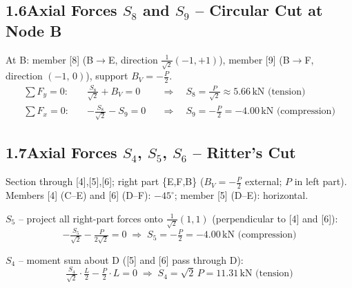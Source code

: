 \documentclass[a4paper,11pt]{article}
\begin{document}
\begin{center}
\end{center}


\subsection*{1.6\quad Axial Forces $S_8$ and $S_9$ -- Circular Cut at Node B}

At B: member [8] (B$\to$E, direction $\tfrac{1}{\sqrt{2}}(-1,+1)$),
member [9] (B$\to$F, direction $(-1,\,0)$), support $B_V = -\tfrac{P}{2}$.
\begin{align*}
  \sum F_y = 0:\quad & \tfrac{S_8}{\sqrt{2}} + B_V = 0
    &&\Rightarrow\quad \boxed{S_8 = \tfrac{P}{\sqrt{2}} \approx 5.66\,\text{kN (tension)}} \\
  \sum F_x = 0:\quad & -\tfrac{S_8}{\sqrt{2}} - S_9 = 0
    &&\Rightarrow\quad \boxed{S_9 = -\tfrac{P}{2} = -4.00\,\text{kN (compression)}}
\end{align*}

\subsection*{1.7\quad Axial Forces $S_4$, $S_5$, $S_6$ -- Ritter's Cut}

Section through [4],[5],[6]; right part \{E,F,B\} ($B_V = -\tfrac{P}{2}$ external; $P$ in left part).
Members [4] (C--E) and [6] (D--F): $-45^\circ$; member [5] (D--E): horizontal.

\textbf{$S_5$} -- project all right-part forces onto $\tfrac{1}{\sqrt{2}}(1,1)$
(perpendicular to [4] and [6]):
\[
  -\tfrac{S_5}{\sqrt{2}} - \tfrac{P}{2\sqrt{2}} = 0
  \;\Rightarrow\; \boxed{S_5 = -\tfrac{P}{2} = -4.00\,\text{kN (compression)}}
\]

\textbf{$S_4$} -- moment sum about D ([5] and [6] pass through D):
\[
  \tfrac{S_4}{\sqrt{2}}\cdot\tfrac{L}{2} - \tfrac{P}{2}\cdot L = 0
  \;\Rightarrow\; \boxed{S_4 = \sqrt{2}\,P = 11.31\,\text{kN (tension)}}
\]
\end{document}
